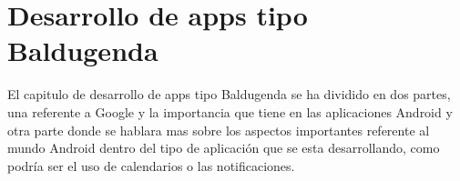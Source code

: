\chapter{Desarrollo de apps tipo Baldugenda}
\label{ch:desarrollo}

El capitulo de desarrollo de apps tipo Baldugenda se ha dividido en dos partes, una referente a Google y la importancia que tiene en las aplicaciones Android y otra parte donde se hablara mas sobre los aspectos importantes referente al mundo Android dentro del tipo de aplicación que se esta desarrollando, como podría ser el uso de calendarios o las notificaciones.




\newpage























